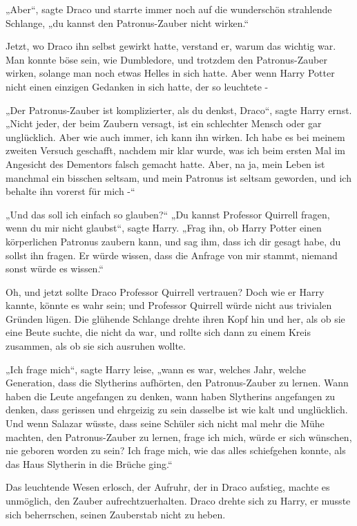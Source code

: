 {„Aber“, sagte Draco und starrte immer noch auf die wunderschön strahlende Schlange, „du kannst den Patronus-Zauber nicht wirken.“

Jetzt, wo Draco ihn selbst gewirkt hatte, verstand er, warum das wichtig war. Man konnte böse sein, wie Dumbledore, und trotzdem den Patronus-Zauber wirken, solange man noch etwas Helles in sich hatte. Aber wenn Harry Potter nicht einen einzigen Gedanken in sich hatte, der so leuchtete -

„Der Patronus-Zauber ist komplizierter, als du denkst, Draco“, sagte Harry ernst. „Nicht jeder, der beim Zaubern versagt, ist ein schlechter Mensch oder gar unglücklich. Aber wie auch immer, ich kann ihn wirken. Ich habe es bei meinem zweiten Versuch geschafft, nachdem mir klar wurde, was ich beim ersten Mal im Angesicht des Dementors falsch gemacht hatte. Aber, na ja, mein Leben ist manchmal ein bisschen seltsam, und mein Patronus ist seltsam geworden, und ich behalte ihn vorerst für mich -“

„Und das soll ich einfach so glauben?“ „Du kannst Professor Quirrell fragen, wenn du mir nicht glaubst“, sagte Harry. „Frag ihn, ob Harry Potter einen körperlichen Patronus zaubern kann, und sag ihm, dass ich dir gesagt habe, du sollst ihn fragen. Er würde wissen, dass die Anfrage von mir stammt, niemand sonst würde es wissen.“

Oh, und jetzt sollte Draco Professor Quirrell vertrauen? Doch wie er Harry kannte, könnte es wahr sein; und Professor Quirrell würde nicht aus trivialen Gründen lügen. Die glühende Schlange drehte ihren Kopf hin und her, als ob sie eine Beute suchte, die nicht da war, und rollte sich dann zu einem Kreis zusammen, als ob sie sich ausruhen wollte.

„Ich frage mich“, sagte Harry leise, „wann es war, welches Jahr, welche Generation, dass die Slytherins aufhörten, den Patronus-Zauber zu lernen. Wann haben die Leute angefangen zu denken, wann haben Slytherins angefangen zu denken, dass gerissen und ehrgeizig zu sein dasselbe ist wie kalt und unglücklich. Und wenn Salazar wüsste, dass seine Schüler sich nicht mal mehr die Mühe machten, den Patronus-Zauber zu lernen, frage ich mich, würde er sich wünschen, nie geboren worden zu sein? Ich frage mich, wie das alles schiefgehen konnte, als das Haus Slytherin in die Brüche ging.“

Das leuchtende Wesen erlosch, der Aufruhr, der in Draco aufstieg, machte es unmöglich, den Zauber aufrechtzuerhalten. Draco drehte sich zu Harry, er musste sich beherrschen, seinen Zauberstab nicht zu heben.

}
